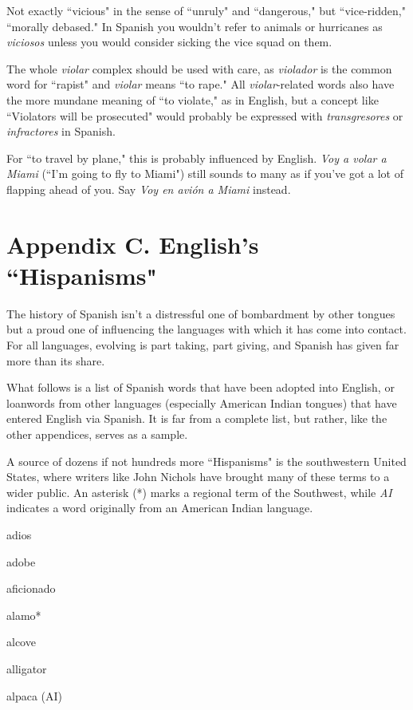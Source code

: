  Not exactly ``vicious" in the sense of ``unruly" and
``dangerous," but ``vice-ridden," ``morally debased." In Spanish you
wouldn't refer to animals or hurricanes as \emph{viciosos} unless you would
consider sicking the vice squad on them.

 The whole \emph{violar} complex should be used with
care, as \emph{violador} is the common word for ``rapist" and \emph{violar} means
``to rape." All \emph{violar}-related words also have the more mundane meaning of ``to violate," as in English, but a concept like ``Violators will be
prosecuted" would probably be expressed with \emph{transgresores} or \emph{infractores} in Spanish.

 For ``to travel by plane," this is probably influenced
by English. \emph{Voy a volar a Miami} (``I'm going to fly to Miami") still
sounds to many as if you've got a lot of flapping ahead of you. Say \emph{Voy
	en avión a Miami} instead.

\chapter{Appendix C. English's ``Hispanisms"}

The history of Spanish isn't a distressful one of bombardment
by other tongues but a proud one of influencing the languages with
which it has come into contact. For all languages, evolving is part taking, part giving, and Spanish has given far more than its share.

What follows is a list of Spanish words that have been adopted
into English, or loanwords from other languages (especially American
Indian tongues) that have entered English via Spanish. It is far from a
complete list, but rather, like the other appendices, serves as a sample.

A source of dozens if not hundreds more ``Hispanisms" is the
southwestern United States, where writers like John Nichols have
brought many of these terms to a wider public. An asterisk (*) marks a
regional term of the Southwest, while \emph{AI} indicates a word originally
from an American Indian language.

\bsk

adios

adobe

aficionado

alamo*

alcove

alligator

alpaca (AI)

